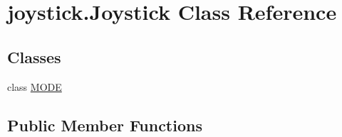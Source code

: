 \hypertarget{classjoystick_1_1Joystick}{\section{joystick.\-Joystick Class Reference}
\label{classjoystick_1_1Joystick}
}
\subsection*{Classes}
\begin{DoxyCompactItemize}
\item 
class \hyperlink{classjoystick_1_1Joystick_1_1MODE}{M\-O\-D\-E}
\end{DoxyCompactItemize}
\subsection*{Public Member Functions}
